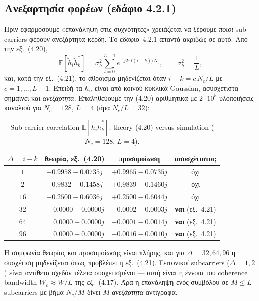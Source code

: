 \documentclass[11pt,a4paper]{article}
\newcommand{\en}[1]{\textenglish{#1}}
\begin{document}
\subsection{Ανεξαρτησία φορέων (εδάφιο 4.2.1)}\label{sec:indep}

Πριν εφαρμόσουμε «επανάληψη στις συχνότητες» χρειάζεται να ξέρουμε \emph{ποιοι}
\en{subcarriers} φέρουν ανεξάρτητα κέρδη. Το εδάφιο~4.2.1 απαντά ακριβώς σε αυτό. Από την
εξ.~(4.20),
\[
  \mathbb{E}\!\left[\tilde h_i \tilde h_k^{*}\right]
  = \sigma_h^2 \sum_{l=0}^{L-1} e^{-j2\pi l (i-k)/N_c},
  \qquad \sigma_h^2 = \frac{1}{L},
\]
και, κατά την εξ.~(4.21), το άθροισμα μηδενίζεται όταν $i-k = c\,N_c/L$ με
$c = 1,\dots,L-1$. Επειδή τα $\tilde h_n$ είναι από κοινού κυκλικά \en{Gaussian},
ασυσχέτιστα σημαίνει και \emph{ανεξάρτητα}. Επαληθεύουμε την (4.20) αριθμητικά με
$2\cdot10^5$ υλοποιήσεις καναλιού για $N_c = 128$, $L = 4$ (άρα $N_c/L = 32$):

\begin{table}[H]
  \centering\small
  \begin{tabular}{cccc}
    \toprule
    $\Delta = i-k$ & θεωρία, εξ.~(4.20) & προσομοίωση & ασυσχέτιστοι; \\
    \midrule
    $1$  & $+0.9958-0.0735j$ & $+0.9965-0.0735j$ & όχι \\
    $2$  & $+0.9832-0.1458j$ & $+0.9839-0.1460j$ & όχι \\
    $16$ & $+0.2500-0.6036j$ & $+0.2500-0.6044j$ & όχι \\
    $32$ & $\phantom{+}0.0000+0.0000j$ & $-0.0002-0.0003j$ & \textbf{ναι} (εξ.~4.21) \\
    $64$ & $\phantom{+}0.0000+0.0000j$ & $-0.0001-0.0014j$ & \textbf{ναι} (εξ.~4.21) \\
    $96$ & $\phantom{+}0.0000+0.0000j$ & $-0.0016-0.0010j$ & \textbf{ναι} (εξ.~4.21) \\
    \bottomrule
  \end{tabular}
  \caption{\en{Sub-carrier correlation $\mathbb{E}[\tilde h_i \tilde h_k^{*}]$: theory
  (4.20) versus simulation ($N_c=128$, $L=4$).}}
\end{table}

Η συμφωνία θεωρίας και προσομοίωσης είναι πλήρης, και για $\Delta = 32, 64, 96$ η συσχέτιση
μηδενίζεται όπως προβλέπει η εξ.~(4.21). Γειτονικοί \en{subcarriers} ($\Delta = 1, 2$) είναι
αντίθετα σχεδόν τέλεια συσχετισμένοι — αυτή είναι η έννοια του \en{coherence bandwidth}
$W_c \approx W/L$ της εξ.~(4.17). Άρα η επανάληψη ενός συμβόλου σε $M \le L$
\en{subcarriers} με βήμα $N_c/M$ δίνει $M$ \emph{ανεξάρτητα} αντίγραφα.
\end{document}
